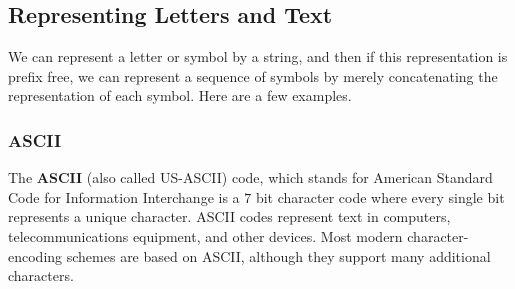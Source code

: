 \documentclass{article}
\begin{document}
  \subsection{Representing Letters and Text}
  We can represent a letter or symbol by a string, and then if this representation is prefix free, we can represent a sequence of symbols by merely concatenating the representation of each symbol. Here are a few examples. 

  \subsubsection{ASCII}

  The \textbf{ASCII} (also called US-ASCII) code, which stands for American Standard Code for Information Interchange is a $7$ bit character code where every single bit represents a unique character. ASCII codes represent text in computers, telecommunications equipment, and other devices. Most modern character-encoding schemes are based on ASCII, although they support many additional characters.
\end{document}
